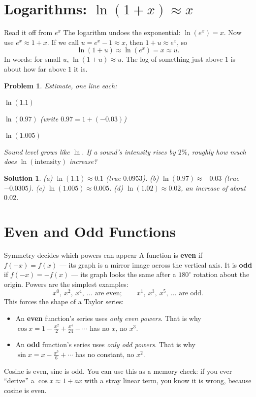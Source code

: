 \documentclass[11pt]{article}
\newcommand{\clearpts}{\addtocounter{tpts}{\value{cpts}} \setcounter{cpts}{0}}
\newcommand{\pts}[1]{\clearpts \setcounter{cpts}{#1}}
\newtheorem*{solution}{Solution}
\theoremstyle{mystyle}
\newtheorem{pproblem}{Problem}
\begin{document}
\section{Logarithms: $\ln(1+x) \approx x$}

\begin{psidea}{Read it off from $e^x$}{}
The logarithm undoes the exponential: $\ln(e^x) = x$. Now use $e^x \approx 1 + x$. If we
call $u = e^x - 1 \approx x$, then $1 + u \approx e^x$, so
\[
\ln(1+u) \approx \ln(e^x) = x \approx u.
\]
In words: for small $u$, $\ln(1+u) \approx u$. The log of something just above $1$ is
about how far above $1$ it is.
\end{psidea}

\pts{4}
\begin{pproblem}
Estimate, one line each:
\begin{subpart}
\item $\ln(1.1)$
\item $\ln(0.97)$ \quad (write $0.97 = 1 + (-0.03)$)
\item $\ln(1.005)$
\item Sound level grows like $\ln$. If a sound's intensity rises by $2\%$, roughly how
much does $\ln(\text{intensity})$ increase?
\end{subpart}
\end{pproblem}
\begin{solution}
(a) $\ln(1.1)\approx 0.1$ (true $0.0953$).\quad
(b) $\ln(0.97)\approx -0.03$ (true $-0.0305$).\quad
(c) $\ln(1.005)\approx 0.005$.\quad
(d) $\ln(1.02)\approx 0.02$, an increase of about $0.02$.
\end{solution}

\section{Even and Odd Functions}

\begin{psidea}{Symmetry decides which powers can appear}{}
A function is \textbf{even} if $f(-x) = f(x)$ --- its graph is a mirror image across the
vertical axis. It is \textbf{odd} if $f(-x) = -f(x)$ --- its graph looks the same after
a $180^\circ$ rotation about the origin. Powers are the simplest examples:
\[
x^0,\ x^2,\ x^4,\ \dots \text{ are even};\qquad x^1,\ x^3,\ x^5,\ \dots \text{ are odd}.
\]
This forces the shape of a Taylor series:
\begin{itemize}
\item An \textbf{even} function's series uses \emph{only even powers}. That is why
$\cos x = 1 - \tfrac{x^2}{2} + \tfrac{x^4}{24} - \cdots$ has no $x$, no $x^3$.
\item An \textbf{odd} function's series uses \emph{only odd powers}. That is why
$\sin x = x - \tfrac{x^3}{6} + \cdots$ has no constant, no $x^2$.
\end{itemize}
Cosine is even, sine is odd. You can use this as a memory check: if you ever ``derive''
a $\cos x \approx 1 + ax$ with a stray linear term, you know it is wrong, because cosine
is even.
\end{psidea}
\end{document}
